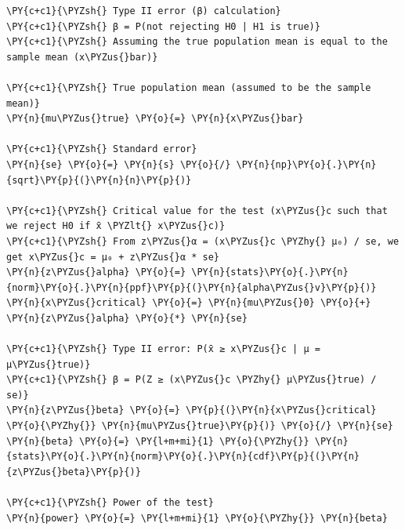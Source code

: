     \begin{tcolorbox}[breakable, size=fbox, boxrule=1pt, pad at break*=1mm,colback=cellbackground, colframe=cellborder]
\begin{Verbatim}[commandchars=\\\{\}]
\PY{c+c1}{\PYZsh{} Type II error (β) calculation}
\PY{c+c1}{\PYZsh{} β = P(not rejecting H0 | H1 is true)}
\PY{c+c1}{\PYZsh{} Assuming the true population mean is equal to the sample mean (x\PYZus{}bar)}

\PY{c+c1}{\PYZsh{} True population mean (assumed to be the sample mean)}
\PY{n}{mu\PYZus{}true} \PY{o}{=} \PY{n}{x\PYZus{}bar}

\PY{c+c1}{\PYZsh{} Standard error}
\PY{n}{se} \PY{o}{=} \PY{n}{s} \PY{o}{/} \PY{n}{np}\PY{o}{.}\PY{n}{sqrt}\PY{p}{(}\PY{n}{n}\PY{p}{)}

\PY{c+c1}{\PYZsh{} Critical value for the test (x\PYZus{}c such that we reject H0 if x̄ \PYZlt{} x\PYZus{}c)}
\PY{c+c1}{\PYZsh{} From z\PYZus{}α = (x\PYZus{}c \PYZhy{} μ₀) / se, we get x\PYZus{}c = μ₀ + z\PYZus{}α * se}
\PY{n}{z\PYZus{}alpha} \PY{o}{=} \PY{n}{stats}\PY{o}{.}\PY{n}{norm}\PY{o}{.}\PY{n}{ppf}\PY{p}{(}\PY{n}{alpha\PYZus{}v}\PY{p}{)}
\PY{n}{x\PYZus{}critical} \PY{o}{=} \PY{n}{mu\PYZus{}0} \PY{o}{+} \PY{n}{z\PYZus{}alpha} \PY{o}{*} \PY{n}{se}

\PY{c+c1}{\PYZsh{} Type II error: P(x̄ ≥ x\PYZus{}c | μ = μ\PYZus{}true)}
\PY{c+c1}{\PYZsh{} β = P(Z ≥ (x\PYZus{}c \PYZhy{} μ\PYZus{}true) / se)}
\PY{n}{z\PYZus{}beta} \PY{o}{=} \PY{p}{(}\PY{n}{x\PYZus{}critical} \PY{o}{\PYZhy{}} \PY{n}{mu\PYZus{}true}\PY{p}{)} \PY{o}{/} \PY{n}{se}
\PY{n}{beta} \PY{o}{=} \PY{l+m+mi}{1} \PY{o}{\PYZhy{}} \PY{n}{stats}\PY{o}{.}\PY{n}{norm}\PY{o}{.}\PY{n}{cdf}\PY{p}{(}\PY{n}{z\PYZus{}beta}\PY{p}{)}

\PY{c+c1}{\PYZsh{} Power of the test}
\PY{n}{power} \PY{o}{=} \PY{l+m+mi}{1} \PY{o}{\PYZhy{}} \PY{n}{beta}


\end{Verbatim}
\end{tcolorbox}
